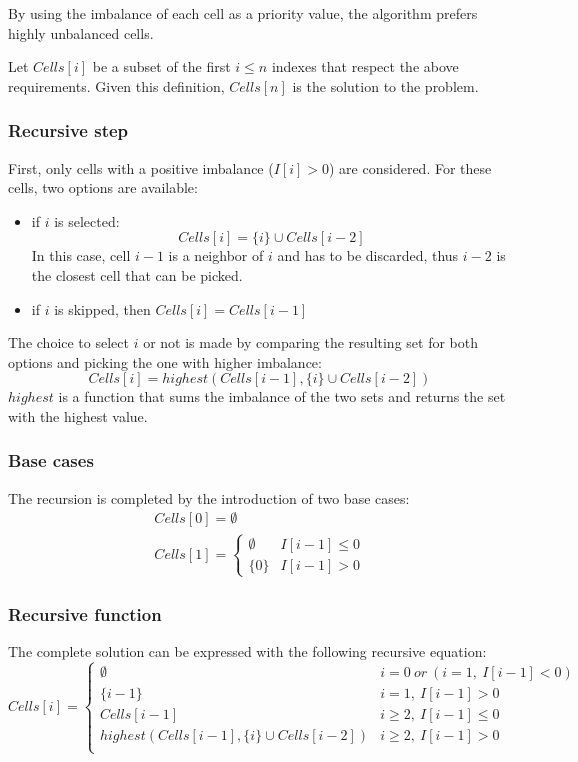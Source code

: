 By using the imbalance of each cell as a priority value, the algorithm prefers highly unbalanced cells.

Let $Cells[i]$ be a subset of the first $i \le n$ indexes that respect the above requirements. Given this definition, $Cells[n]$ is the solution to the problem.

\subsubsection{Recursive step}
First, only cells with a positive imbalance ($I[i] > 0$) are considered. For these cells, two options are available:
\begin{itemize}
    \item if $i$ is selected:
          \[
              Cells[i] = \{i\} \cup Cells[i-2]
          \]
          In this case, cell $i-1$ is a neighbor of $i$ and has to be discarded, thus $i-2$ is the closest cell that can be picked.
    \item if $i$ is skipped, then $Cells[i]=Cells[i-1]$
\end{itemize}
The choice to select $i$ or not is made by comparing the resulting set for both options and picking the one with higher imbalance:
\begin{equation}
    Cells[i] = \mathit{highest}(Cells[i-1], \{i\} \cup Cells[i-2])
\end{equation}
$\mathit{highest}$ is a function that sums the imbalance of the two sets and returns the set with the highest value.

\subsubsection{Base cases}
The recursion is completed by the introduction of two base cases:
\begin{gather}
    Cells[0]=\emptyset \\
    Cells[1]=\begin{cases}
        \emptyset & I[i-1] \leq 0 \\
        \{ 0 \}   & I[i-1] > 0
    \end{cases}
\end{gather}

\subsubsection{Recursive function}
The complete solution can be expressed with the following recursive equation:
\[
    Cells[i] = \begin{cases}
        \emptyset                                           & i=0\ or\ (i=1,\ I[i-1]<0) \\
        \{i-1\}                                             & i=1, \ I[i-1] > 0         \\
        Cells[i-1]                                          & i \ge 2,\ I[i-1] \leq 0   \\
        \mathit{highest}(Cells[i-1], \{i\} \cup Cells[i-2]) & i \ge 2,\ I[i-1] > 0      \\
    \end{cases}
\]

